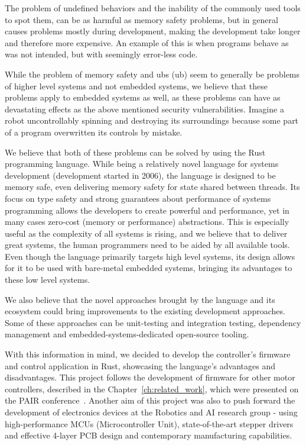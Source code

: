 The problem of undefined behaviors and the inability of the commonly used tools to spot them, can be as harmful as memory safety problems, but in general causes problems mostly during development, making the development take longer and therefore more expensive.
An example of this is when programs behave as was not intended, but with seemingly error-less code.

While the problem of memory safety and \acs{ub}s (\acl{ub}) seem to generally be problems of higher level systems and not embedded systems, we believe that these problems apply to embedded systems as well, as these problems can have as devastating effects as the above mentioned security vulnerabilities.
Imagine a robot uncontrollably spinning and destroying its surroundings because some part of a program overwritten its controls by mistake.

We believe that both of these problems can be solved by using the Rust programming language.
While being a relatively novel language for systems development (development started in 2006), the language is designed to be memory safe, even delivering memory safety for state shared between threads.
Its focus on type safety and strong guarantees about performance of systems programming allows the developers to create powerful and performance, yet in many cases zero-cost (memory or performance) abstractions.
This is especially useful as the complexity of all systems is rising, and we believe that to deliver great systems, the human programmers need to be aided by all available tools.
Even though the language primarily targets high level systems, its design allows for it to be used with bare-metal embedded systems, bringing its advantages to these low level systems.

We also believe that the novel approaches brought by the language and its ecosystem could bring improvements to the existing development approaches.
Some of these approaches can be unit-testing and integration testing, dependency management and embedded-systems-dedicated open-source tooling.

With this information in mind, we decided to develop the controller's firmware and control application in Rust, showcasing the language's advantages and disadvantages.
This project follows the development of firmware for other motor controllers, described in the Chapter~\ref{ch:related_work}, which were presented on the PAIR conference~\cite{faigl_program_nodate}.
Another aim of this project was also to push forward the development of electronics devices at the Robotics and AI research group - using high-performance MCUs (Microcontroller Unit), state-of-the-art stepper drivers and effective 4-layer PCB design and contemporary manufacturing capabilities.

